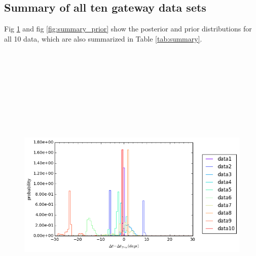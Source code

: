 \documentclass[\docopts]{\docclass}
\begin{document}
\subsection{Summary of all ten gateway data sets}
Fig \ref{fig:summary_post} and fig \ref{fig:summary_prior} show the posterior and prior distributions for all 10 data, which are also summarized in Table \ref{tab:summary}. 
\begin{figure}[!h]
\includegraphics[width=\textwidth, height=15cm, keepaspectratio]{summary_posterior_summary.png}
\caption{}
\label{fig:summary_post}
\end{figure}
\end{document}
